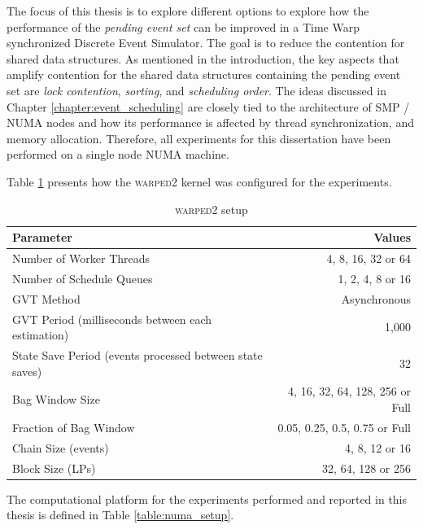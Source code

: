 \documentclass[11pt]{book}
\begin{document}
The focus of this thesis is to explore different options to explore how the performance of the \emph{pending
  event set} can be improved in a Time Warp synchronized Discrete Event Simulator.  The goal is to reduce the
contention for shared data structures.  As mentioned in the introduction, the key aspects that amplify
contention for the shared data structures containing the pending event set are \emph{lock contention},
\emph{sorting}, and \emph{scheduling order}.  The ideas discussed in Chapter \ref{chapter:event_scheduling}
are closely tied to the architecture of SMP / NUMA nodes and how its performance is affected by thread
synchronization, and memory allocation.  Therefore, all experiments for this dissertation have been performed
on a single node NUMA machine.

Table \ref{table:warped2_setup} presents how the \textsc{warped2} kernel was configured for the experiments.

\begin{table}
    \centering
    \begin{tabular}{|| l | r ||}
        \hline
        Parameter                   &   Values\\ [0.5ex]
        \hline\hline
        Number of Worker Threads    &   4, 8, 16, 32 or 64\\
        Number of Schedule Queues   &   1, 2, 4, 8 or 16\\
        GVT Method                  &   Asynchronous\\
        GVT Period (milliseconds between each estimation)           &   1,000\\
        State Save Period (events processed between state saves)    &   32\\
        Bag Window Size             &   4, 16, 32, 64, 128, 256 or Full\\
        Fraction of Bag Window      &   0.05, 0.25, 0.5, 0.75 or Full\\
        Chain Size (events)         &   4, 8, 12 or 16\\
        Block Size (LPs)            &   32, 64, 128 or 256\\
        \hline
    \end{tabular}
    \caption{\textsc{warped2} setup}\label{table:warped2_setup}
\end{table}

The computational platform for the experiments performed and reported in this thesis is defined in Table
\ref{table:numa_setup}.
\end{document}
